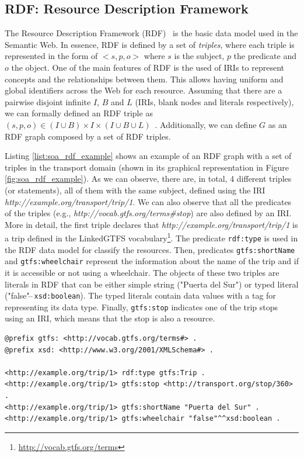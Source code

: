 \subsection{RDF: Resource Description Framework}
The Resource Description Framework (RDF)~\citep{RDF} is the basic data model used in the Semantic Web. In essence, RDF is defined by a set of \textit{triples}, where each triple is represented in the form of $<s,p,o>$ where $s$ is the subject, $p$ the predicate and $o$ the object. One of the main features of RDF is the used of IRIs to represent concepts and the relationships between them. This allows having uniform and global identifiers across the Web for each resource. Assuming that there are a pairwise disjoint infinite $I$, $B$ and $L$ (IRIs, blank nodes and literals respectively), we can formally defined an RDF triple as $(s,p,o) \in (I \cup B) \times I \times (I \cup B \cup L)$~\citep{perez2009semantics}. Additionally, we can define $G$ as an RDF graph composed by a set of RDF triples.

Listing \ref{list:soa_rdf_example} shows an example of an RDF graph with a set of triples in the transport domain (shown in its graphical representation in Figure \ref{fig:soa_rdf_example}). As we can observe, there are, in total, 4 different triples (or statements), all of them with the same subject, defined using the IRI \textit{http://example.org/transport/trip/1}. We can also observe that all the predicates of the triples (e.g., \textit{http://vocab.gtfs.org/terms\#stop}) are also defined by an IRI. More in detail, the first triple declares that \textit{http://example.org/transport/trip/1} is a trip defined in the LinkedGTFS vocabulary\footnote{\url{http://vocab.gtfs.org/terms}}. The predicate \texttt{rdf:type} is used in the RDF data model for classify the resources. Then, predicates \texttt{gtfs:shortName} and \texttt{gtfs:wheelchair} represent the information about the name of the trip and if it is accessible or not using a wheelchair. The objects of these two triples are literals in RDF that can be either simple string ("Puerta del Sur") or typed literal ("false"$\hat{\;}\hat{\;}$\texttt{xsd:boolean}). The typed literals contain data values with a tag for representing its data type. Finally, \texttt{gtfs:stop} indicates one of the trip stops using an IRI, which means that the stop is also a resource. 


\begin{lstlisting}[float,caption=Example of RDF graph,frame=tlrb,label={list:soa_rdf_example}, columns=fullflexible]
@prefix gtfs: <http://vocab.gtfs.org/terms#> .
@prefix xsd: <http://www.w3.org/2001/XMLSchema#> .

<http://example.org/trip/1> rdf:type gtfs:Trip .
<http://example.org/trip/1> gtfs:stop <http://transport.org/stop/360> .
<http://example.org/trip/1> gtfs:shortName "Puerta del Sur" .
<http://example.org/trip/1> gtfs:wheelchair "false"^^xsd:boolean .
\end{lstlisting}

